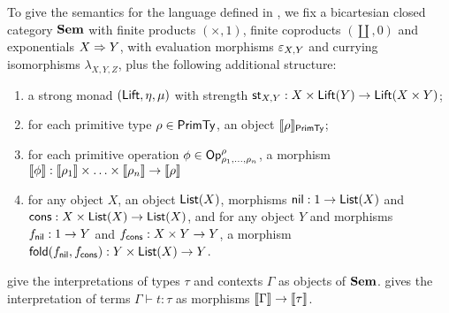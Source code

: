 To give the semantics for the language defined in , we fix a bicartesian closed
category $\mathbf{Sem}$ with finite products $(\times, 1)$, finite coproducts $(\coprod, 0)$ and exponentials
$X \Rightarrow Y$, with evaluation morphisms $\varepsilon_{X,Y}$ and currying isomorphisms $\lambda_{X,Y,Z}$,
plus the following additional structure:
\begin{enumerate}
\item a strong monad $(\mathsf{Lift}, \eta, \mu)$ with strength $\mathsf{st}_{X,Y}: X \times \mathsf{Lift}(Y) \to \mathsf{Lift}(X
\times Y)$;
\item for each primitive type $\rho \in \mathsf{PrimTy}$, an object $\llbracket \rho \rrbracket_{\mathsf{PrimTy}}$;
\item for each primitive operation $\phi \in \mathsf{Op}^\rho_{\rho_1,\ldots,\rho_n}$, a morphism $\llbracket \phi \rrbracket:
\llbracket \rho_1 \rrbracket \times \ldots \times \llbracket \rho_n \rrbracket \to \llbracket \rho \rrbracket$
\item for any object $X$, an object $\mathsf{List}(X)$, morphisms $\mathsf{nil}: 1 \to \mathsf{List}(X)$ and $\mathsf{cons}: X \times \mathsf{List}(X)
\to \mathsf{List}(X)$, and for any object $Y$ and morphisms $f_{\mathsf{nil}}: 1 \to Y$ and $f_{\mathsf{cons}}: X \times Y \to Y$, a
morphism $\mathsf{fold}(f_{\mathsf{nil}},f_{\mathsf{cons}}): Y \times \mathsf{List}(X) \to Y$.
\end{enumerate}

 give the interpretations of types $\tau$ and contexts $\Gamma$
as objects of $\mathbf{Sem}$.  gives the interpretation of terms $\Gamma \vdash t: \tau$ as
morphisms $\llbracket \Gamma \rrbracket \to \llbracket \tau \rrbracket$.

